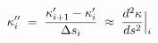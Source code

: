 \documentclass[preview]{standalone}
\begin{document}
\begin{align*}
\special{dvisvgm:raw <g id='unique000'>}\kappa''_i \;=\; \dfrac{\kappa'_{i+1} - \kappa'_i}{\Delta s_i} \;\approx\; \dfrac{d^2\kappa}{ds^2}\Big|_i\special{dvisvgm:raw </g>}
\end{align*}
\end{document}
